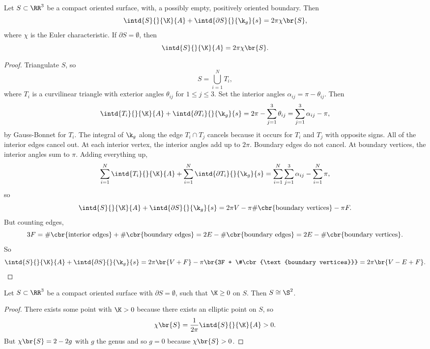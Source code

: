 \pagebreak

\begin{theorem}
Let $ S \subset \RR^3 $ be a compact oriented surface, with, a possibly empty, positively oriented boundary. Then
$$ \intd{S}{}{\K}{A} + \intd{\partial S}{}{\k_g}{s} = 2\pi\chi\br{S}, $$
where $ \chi $ is the Euler characteristic. If $ \partial S = \emptyset $, then
$$ \intd{S}{}{\K}{A} = 2\pi\chi\br{S}. $$
\end{theorem}

\begin{proof}
Triangulate $ S $, so
$$ S = \bigcup_{i = 1}^N T_i, $$
where $ T_i $ is a curvilinear triangle with exterior angles $ \theta_{ij} $ for $ 1 \le j \le 3 $. Set the interior angles $ \alpha_{ij} = \pi - \theta_{ij} $. Then
$$ \intd{T_i}{}{\K}{A} + \intd{\partial T_i}{}{\k_g}{s} = 2\pi - \sum_{j = 1}^3 \theta_{ij} = \sum_{j = 1}^3 \alpha_{ij} - \pi, $$
by Gauss-Bonnet for $ T_i $. The integral of $ \k_g $ along the edge $ T_i \cap T_j $ cancels because it occurs for $ T_i $ and $ T_j $ with opposite signs. All of the interior edges cancel out. At each interior vertex, the interior angles add up to $ 2\pi $. Boundary edges do not cancel. At boundary vertices, the interior angles sum to $ \pi $. Adding everything up,
$$ \sum_{i = 1}^N \intd{T_i}{}{\K}{A} + \sum_{i = 1}^N \intd{\partial T_i}{}{\k_g}{s} = \sum_{i = 1}^N \sum_{j = 1}^3 \alpha_{ij} - \sum_{i = 1}^N \pi, $$
so
$$ \intd{S}{}{\K}{A} + \intd{\partial S}{}{\k_g}{s} = 2\pi V - \pi\#\cbr{\text{boundary vertices}} - \pi F. $$
But counting edges,
$$ 3F = \#\cbr{\text{interior edges}} + \#\cbr{\text{boundary edges}} = 2E - \#\cbr{\text{boundary edges}} = 2E - \#\cbr{\text{boundary vertices}}. $$
So
$$ \intd{S}{}{\K}{A} + \intd{\partial S}{}{\k_g}{s} = 2\pi\br{V + F} - \pi\br{3F + \#\cbr{\text{boundary vertices}}} = 2\pi\br{V - E + F}. $$
\end{proof}

\begin{corollary}
Let $ S \subset \RR^3 $ be a compact oriented surface with $ \partial S = \emptyset $, such that $ \K \ge 0 $ on $ S $. Then $ S \cong \S^2 $.
\end{corollary}

\begin{proof}
There exists some point with $ \K > 0 $ because there exists an elliptic point on $ S $, so
$$ \chi\br{S} = \dfrac{1}{2\pi}\intd{S}{}{\K}{A} > 0. $$
But $ \chi\br{S} = 2 - 2g $ with $ g $ the genus and so $ g = 0 $ because $ \chi\br{S} > 0 $.
\end{proof}

